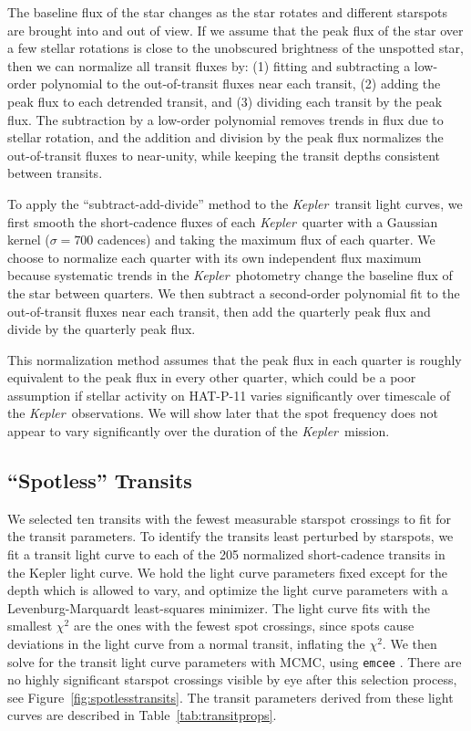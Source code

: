 \documentclass[iop]{emulateapj}
\newcommand{\kepler}{\textit{Kepler}}
\begin{document}
The baseline flux of the star changes as the star rotates and different starspots are brought into and out of view. If we assume that the peak flux of the star over a few stellar rotations is close to the unobscured brightness of the unspotted star, then we can normalize all transit fluxes by: (1) fitting and subtracting a low-order polynomial to the out-of-transit fluxes near each transit, (2) adding the peak flux to each detrended transit, and (3) dividing each transit by the peak flux. The subtraction by a low-order polynomial removes trends in flux due to stellar rotation, and the addition and division by the peak flux normalizes the out-of-transit fluxes to near-unity, while keeping the transit depths consistent between transits. 

To apply the ``subtract-add-divide'' method to the \kepler\ transit light curves, we first smooth the short-cadence fluxes of each \kepler\ quarter with a Gaussian kernel ($\sigma=700$ cadences) and taking the maximum flux of each quarter. We choose to normalize each quarter with its own independent flux maximum because systematic trends in the \kepler\ photometry change the baseline flux of the star between quarters. We then subtract a second-order polynomial fit to the out-of-transit fluxes near each transit, then add the quarterly peak flux and divide by the quarterly peak flux. 

This normalization method assumes that the peak flux in each quarter is roughly equivalent to the peak flux in every other quarter, which could be a poor assumption if stellar activity on HAT-P-11 varies significantly over timescale of the \kepler\ observations. We will show later that the spot frequency does not appear to vary significantly over the duration of the \kepler\ mission.

\subsection{``Spotless'' Transits}

We selected ten transits with the fewest measurable starspot crossings to fit for the transit parameters. To identify the transits least perturbed by starspots, we fit a \citet{Mandel2002} transit light curve to each of the 205 normalized short-cadence transits in the Kepler light curve. We hold the light curve parameters fixed except for the depth which is allowed to vary, and optimize the light curve parameters with a Levenburg-Marquardt least-squares minimizer. The light curve fits with the smallest $\chi^2$ are the ones with the fewest spot crossings, since spots cause deviations in the light curve from a normal transit, inflating the $\chi^2$. We then solve for the transit light curve parameters with MCMC, using \texttt{emcee} \citep{Foreman-Mackey2013}. There are no highly significant starspot crossings visible by eye after this selection process, see Figure~\ref{fig:spotlesstransits}. The transit parameters derived from these light curves are described in Table~\ref{tab:transitprops}.
\end{document}
